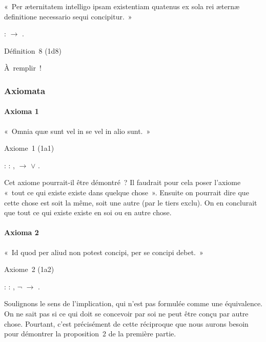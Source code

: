 \documentclass[12pt]{report}
\begin{document}
 « Per æternitatem intelligo ipsam existentiam quatenus ex sola rei
  æternæ definitione necessario sequi concipitur. » \begin{coqdoccode}
\coqdocemptyline
\coqdocindent{1.00em}
 :  \ensuremath{\rightarrow} .\coqdoceol
\coqdocemptyline
\end{coqdoccode}
Définition 8 (1d8) 

 À remplir ! 

\par
\noindent\hrulefill\par
\noindent{}  

\subsubsection{Axiomata}



\paragraph{Axioma 1}

 « Omnia quæ sunt vel in se vel in alio sunt. » 

 Axiome 1 (1a1) \begin{coqdoccode}
\coqdocindent{1.00em}
 :\coqdoceol
\coqdocindent{2.00em}
\coqdockw{\ensuremath{\forall}} : ,\coqdoceol
\coqdocindent{3.00em}
  \ensuremath{\rightarrow} \coqdoceol
\coqdocindent{3.00em}
  \ensuremath{\lor}  .\coqdoceol
\coqdocemptyline
\end{coqdoccode}
Cet axiome pourrait-il être démontré ? Il faudrait pour cela poser
  l'axiome « tout ce qui existe existe dans quelque chose ». Ensuite on
  pourrait dire que cette chose est soit la même, soit une autre (par le
  tiers exclu). On en conclurait que tout ce qui existe existe en soi ou
  en autre chose. 

\paragraph{Axioma 2}

 « Id quod per aliud non potest concipi, per se concipi debet. » 

 Axiome 2 (1a2) \begin{coqdoccode}
\coqdocindent{1.00em}
 :\coqdoceol
\coqdocindent{2.00em}
\coqdockw{\ensuremath{\forall}} : ,\coqdoceol
\coqdocindent{3.00em}
\ensuremath{\lnot}  \ensuremath{\rightarrow} \coqdoceol
\coqdocindent{3.00em}
 .\coqdoceol
\coqdocemptyline
\end{coqdoccode}
Soulignons le sens de l'implication, qui n'est pas formulée comme
  une équivalence. On ne sait pas si ce qui doit se concevoir par soi ne
  peut être conçu par autre chose. Pourtant, c'est précisément de cette
  réciproque que nous aurons besoin pour démontrer la proposition 2 de
  la première partie. 
\end{document}
